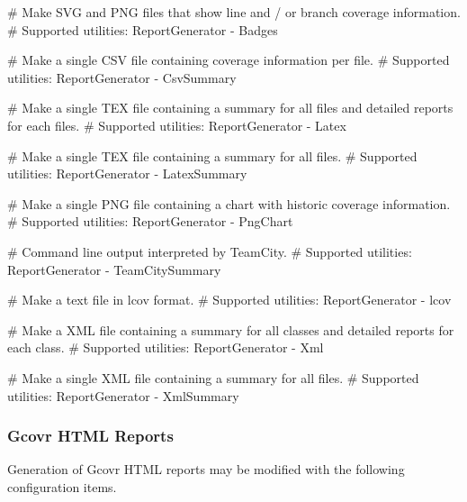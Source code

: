 \begin{DoxyCode}
    # Make SVG and PNG files that show line and / or branch coverage information.
    # Supported utilities: ReportGenerator
    - Badges

    # Make a single CSV file containing coverage information per file.
    # Supported utilities: ReportGenerator
    - CsvSummary

    # Make a single TEX file containing a summary for all files and detailed reports for each files.
    # Supported utilities: ReportGenerator
    - Latex

    # Make a single TEX file containing a summary for all files.
    # Supported utilities: ReportGenerator
    - LatexSummary

    # Make a single PNG file containing a chart with historic coverage information.
    # Supported utilities: ReportGenerator
    - PngChart

    # Command line output interpreted by TeamCity.
    # Supported utilities: ReportGenerator
    - TeamCitySummary

    # Make a text file in lcov format.
    # Supported utilities: ReportGenerator
    - lcov

    # Make a XML file containing a summary for all classes and detailed reports for each class.
    # Supported utilities: ReportGenerator
    - Xml

    # Make a single XML file containing a summary for all files.
    # Supported utilities: ReportGenerator
    - XmlSummary
\end{DoxyCode}


\subsubsection*{Gcovr H\+T\+ML Reports}

Generation of Gcovr H\+T\+ML reports may be modified with the following configuration items.


